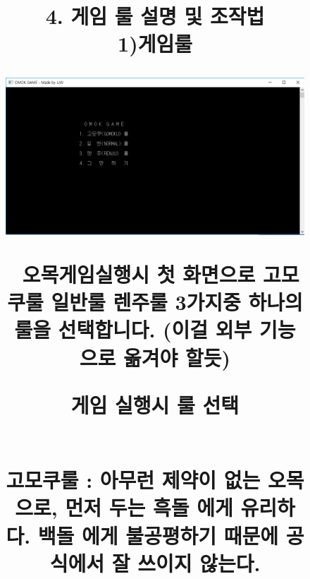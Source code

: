 \documentclass[a4paper, 11pt]{article}
\begin{document}
 \newpage
\title{\textbf{\Huge4. 게임 룰 설명 및 조작법 }
	\vspace{0.5cm}
	\\ 1)게임룰
	
	\begin{figure}[h] %
		\begin{center}
			\includegraphics[width=1.0\linewidth]{OM1.png}
		\end{center}
		\caption{게임 실행시 룰 선택}
		\vspace{0.5cm}
		\ 오목게임실행시 첫 화면으로 고모쿠룰 일반룰 렌주룰 3가지중 하나의 룰을 선택합니다. (이걸 외부 기능으로 옮겨야 할듯)
	\end{figure}
	
	\newpage
	\begin{figure}[h]
		\begin{center}
			\\ 고모쿠룰 :  아무런 제약이 없는 오목으로, 먼저 두는 흑돌 에게 유리하다. 백돌 에게 불공평하기 때문에 공식에서 잘 쓰이지 않는다. 
			
			\vspace{1.5cm} 	
			

\end{center}
\end{figure}}
\end{document}
